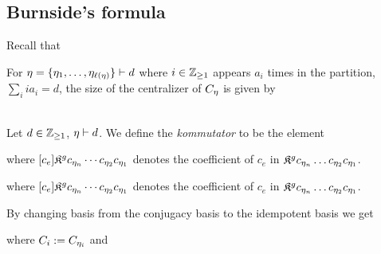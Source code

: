 \documentclass[10pt,handout]{beamer} %
\begin{document}
\subsection{Burnside's formula}

\begin{frame}

Recall that 
\vspace{-3mm}

For $\eta=\{\eta_1,\ldots,\eta_{\ell(\eta)}\}\vdash d$ where $i\in\mathbb Z_{\geq1}$ appears $a_i$ times in the partition, $\sum_i ia_i=d$, the size of the centralizer of $C_\eta$ is given by\\[-8pt]
\\[-8pt]\pause

\begin{definition}
	Let $d\in\mathbb Z_{\geq1}$, $\eta\vdash d$. We define the \emph{kommutator} to be the element
\end{definition}

\begin{theorem}
	where $[c_e]\mathfrak K^gc_{\eta_n}\cdots c_{\eta_2}c_{\eta_1}$ denotes the coefficient of $c_e$ in $\mathfrak K^gc_{\eta_n}\ldots c_{\eta_2}c_{\eta_1}$.
\end{theorem}
\end{frame}

\begin{frame}

\begin{theorem}
	where $[c_e]\mathfrak K^gc_{\eta_n}\cdots c_{\eta_2}c_{\eta_1}$ denotes the coefficient of $c_e$ in $\mathfrak K^gc_{\eta_n}\ldots c_{\eta_2}c_{\eta_1}$.
\end{theorem}

By changing basis from the conjugacy basis to the idempotent basis we get

\begin{theorem}
	where $C_i:=C_{\eta_i}$ and
\end{theorem}

\end{frame}
\end{document}
